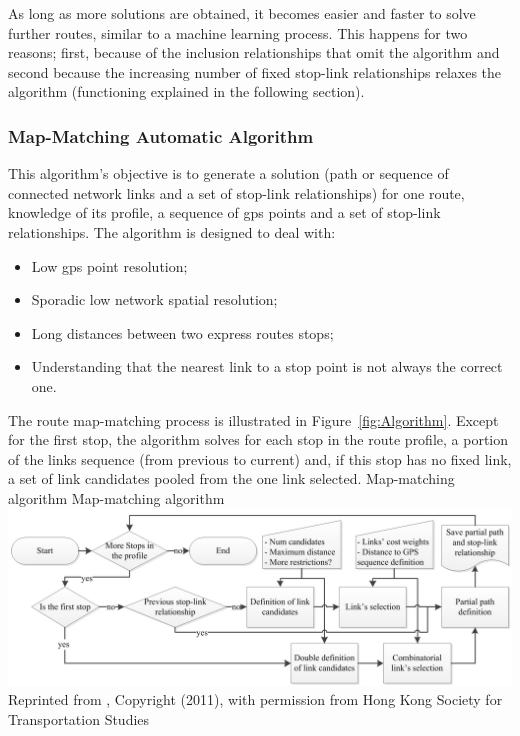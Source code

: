 As long as more solutions are obtained, it becomes easier and faster to solve further routes, similar to a  machine learning process. This happens for two reasons; first, because of the inclusion relationships that omit the algorithm and second because the increasing number of fixed stop-link relationships relaxes the algorithm  (functioning explained in the following section).

\subsubsection{Map-Matching Automatic Algorithm}
This algorithm's objective is to generate a solution (path or sequence of connected network links and a set of stop-link relationships) for one route, knowledge of its profile, a sequence of \gls{gps} points and a set of stop-link relationships. The algorithm is designed to deal with:
%
\begin{itemize}\styleItemize
\item	Low \gls{gps} point resolution;
\item	Sporadic low network spatial resolution;
\item	Long distances between two express routes stops;
\item	Understanding that the nearest link to a stop point is not always the correct one.
\end{itemize}

The route map-matching process is illustrated in Figure~\ref{fig:Algorithm}. Except for the first stop, the algorithm solves for each stop in the route profile, a portion of the links sequence (from previous to current) and, if this stop has no fixed link, a set of link candidates pooled from the one link selected.
%
\createfigure
{Map-matching algorithm}
{Map-matching algorithm}
{\label{fig:Algorithm}}
{\includegraphics[width=1.0\textwidth]{extending/figures/semiAuto/Algorithm.png}}
{Reprinted from \citet[][p.755]{Ordonez_HKSTS_2011}, Copyright (2011), with permission from Hong Kong Society for Transportation Studies}


